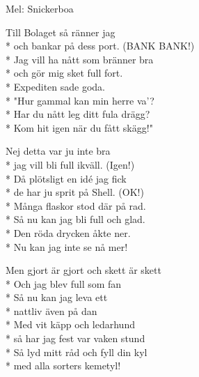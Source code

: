 \begin{SongText}[Bolaget]
    \begin{SongInfo}
        Mel: Snickerboa
    \end{SongInfo}
    \begin{SongVerse}
        Till Bolaget så ränner jag\\*%
        och bankar på dess port. (BANK BANK!)\\*%
        Jag vill ha nått som bränner bra\\*%
        och gör mig sket full fort.\\*%
        Expediten sade goda.\\*%
        "Hur gammal kan min herre va'?\\*%
        Har du nått leg ditt fula drägg?\\*%
        Kom hit igen när du fått skägg!"
    \end{SongVerse}
    \begin{SongVerse}
        Nej detta var ju inte bra\\*%
        jag vill bli full ikväll. (Igen!)\\*%
        Då plötsligt en idé jag fick\\*%
        de har ju sprit på Shell. (OK!)\\*%
        Många flaskor stod där på rad.\\*%
        Så nu kan jag bli full och glad.\\*%
        Den röda drycken åkte ner.\\*%
        Nu kan jag inte se nå mer!
    \end{SongVerse}
    \begin{SongVerse}
        Men gjort är gjort och skett är skett\\*%
        Och jag blev full som fan\\*%
        Så nu kan jag leva ett\\*%
        nattliv även på dan\\*%
        Med vit käpp och ledarhund\\*%
        så har jag fest var vaken stund\\*%
        Så lyd mitt råd och fyll din kyl\\*%
        med alla sorters kemetyl!
    \end{SongVerse}
\end{SongText}
